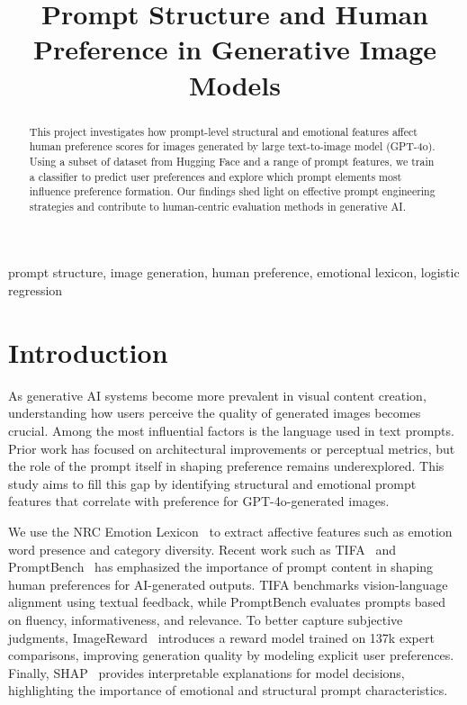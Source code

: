 \documentclass[conference]{IEEEtran}
\begin{document}
\title{Prompt Structure and Human Preference in Generative Image Models}

\author{
}

\maketitle

\begin{abstract}
This project investigates how prompt-level structural and emotional features affect
human preference scores for images generated by large text-to-image model (GPT-4o).
Using a subset of dataset from Hugging Face and a range of prompt features,
we train a classifier to predict user preferences and explore
which prompt elements most influence preference formation. Our findings
shed light on effective prompt engineering strategies and contribute to
human-centric evaluation methods in generative AI.
\end{abstract}

\begin{IEEEkeywords}
prompt structure, image generation, human preference, emotional lexicon, logistic regression
\end{IEEEkeywords}

\section{Introduction}
As generative AI systems become more prevalent in visual content creation, understanding how users perceive the quality of generated images becomes crucial. Among the most influential factors is the language used in text prompts. Prior work has focused on architectural improvements or perceptual metrics, but the role of the prompt itself in shaping preference remains underexplored. This study aims to fill this gap by identifying structural and emotional prompt features that correlate with preference for GPT-4o-generated images.

We use the NRC Emotion Lexicon~\cite{nrc} to extract affective features such as emotion word presence and category diversity.
Recent work such as TIFA~\cite{tifa} and PromptBench~\cite{promptbench} has emphasized the importance of prompt content in shaping human preferences for AI-generated outputs. TIFA benchmarks vision-language alignment using textual feedback, while PromptBench evaluates prompts based on fluency, informativeness, and relevance.
To better capture subjective judgments, ImageReward~\cite{imagereward} introduces a reward model trained on 137k expert comparisons, improving generation quality by modeling explicit user preferences.
Finally, SHAP~\cite{shap} provides interpretable explanations for model decisions, highlighting the importance of emotional and structural prompt characteristics.
\end{document}
